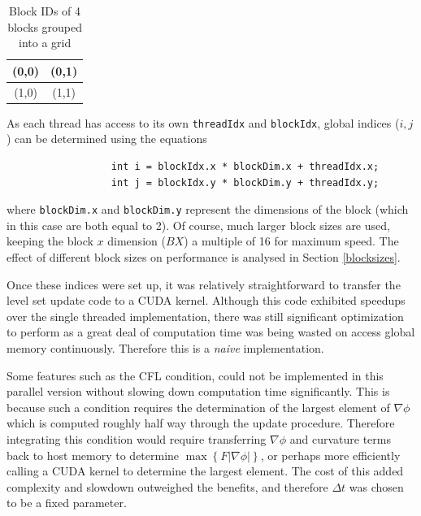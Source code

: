 \begin{table}
\begin{center}
  \begin{tabular}{ | c | c |}
    \hline
    (0,0) & (0,1)  \\ \hline
    (1,0) & (1,1)  \\ \hline
  \end{tabular}
\end{center}
\label{table:blocks}\caption{Block IDs of 4 blocks grouped into a grid}
\end{table}

As each thread has access to its own \texttt{threadIdx} and \texttt{blockIdx}, global indices ($i,j$) can be determined using the equations

\begin{verbatim}
                  int i = blockIdx.x * blockDim.x + threadIdx.x;
                  int j = blockIdx.y * blockDim.y + threadIdx.y;
\end{verbatim}

where \texttt{blockDim.x} and \texttt{blockDim.y} represent the dimensions of the block (which in this case are both equal to 2). Of course, much larger block sizes are used, keeping the block $x$ dimension ($BX$) a multiple of 16 for maximum speed. The effect of different block sizes on performance is analysed in Section \ref{blocksizes}.

Once these indices were set up, it was relatively straightforward to transfer the level set update code to a CUDA kernel. Although this code exhibited speedups over the single threaded implementation, there was still significant optimization to perform as a great deal of computation time was being wasted on access global memory continuously. Therefore this is a \textit{naive} implementation.

Some features such as the CFL condition, could not be implemented in this parallel version without slowing down computation time significantly. This is because such a condition requires the determination of the largest element of $\nabla\phi$ which is computed roughly half way through the update procedure. Therefore integrating this condition would require transferring $\nabla\phi$ and curvature terms back to host memory to determine $\max\left\{F|\nabla\phi|\right\}$, or perhaps more efficiently calling a CUDA kernel to determine the largest element. The cost of this added complexity and slowdown outweighed the benefits, and therefore $\Delta t$ was chosen to be a fixed parameter.





